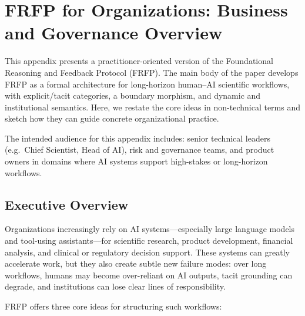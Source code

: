 \section{FRFP for Organizations: Business and Governance Overview}
\label{app:business-frfp}

This appendix presents a practitioner-oriented version of the Foundational Reasoning and Feedback Protocol (FRFP).
The main body of the paper develops FRFP as a formal architecture for long-horizon human--AI scientific workflows, with explicit/tacit categories, a boundary morphism, and dynamic and institutional semantics.
Here, we restate the core ideas in non-technical terms and sketch how they can guide concrete organizational practice.

The intended audience for this appendix includes:
senior technical leaders (e.g.\ Chief Scientist, Head of AI),
risk and governance teams,
and product owners in domains where AI systems support high-stakes or long-horizon workflows.

\subsection{Executive Overview}

Organizations increasingly rely on AI systems---especially large language models and tool-using assistants---for scientific research, product development, financial analysis, and clinical or regulatory decision support.
These systems can greatly accelerate work, but they also create subtle new failure modes:
over long workflows, humans may become over-reliant on AI outputs, tacit grounding can degrade, and institutions can lose clear lines of responsibility.

FRFP offers three core ideas for structuring such workflows:

